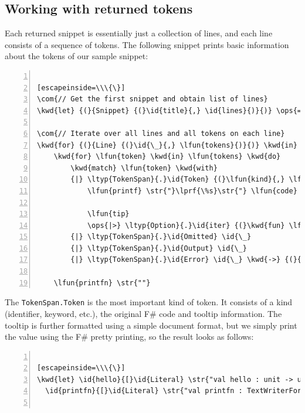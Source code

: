 \documentclass{article}
\newcommand{\id}[1]{\textcolor{black}{#1}}
\newcommand{\com}[1]{\textcolor{officegreen}{#1}}
\newcommand{\kwd}[1]{\textcolor{navy}{#1}}
\newcommand{\ops}[1]{\textcolor{purple}{#1}}
\newcommand{\str}[1]{\textcolor{olive}{#1}}
\begin{document}
\subsection*{Working with returned tokens}



Each returned snippet is essentially just a collection of lines, and each line
consists of a sequence of tokens. The following snippet prints basic information
about the tokens of our sample snippet:
\begin{lstlisting}[numbers=left]

[escapeinside=\\\{\}]
\com{// Get the first snippet and obtain list of lines}
\kwd{let} {(}{Snippet} {(}\id{title}{,} \id{lines}{)}{)} \ops{=} \id{snippets} \ops{|>} \ltyp{Seq}{.}\id{head}

\com{// Iterate over all lines and all tokens on each line}
\kwd{for} {(}{Line} {(}\id{\_}{,} \lfun{tokens}{)}{)} \kwd{in} \id{lines} \kwd{do}
    \kwd{for} \lfun{token} \kwd{in} \lfun{tokens} \kwd{do}
        \kwd{match} \lfun{token} \kwd{with}
        {|} \ltyp{TokenSpan}{.}\id{Token} {(}\lfun{kind}{,} \lfun{code}{,} \lfun{tip}{)} \kwd{->}
            \lfun{printf} \str{"}\lprf{\%s}\str{"} \lfun{code}

            \lfun{tip}
            \ops{|>} \ltyp{Option}{.}\id{iter} {(}\kwd{fun} \lfun{spans} \kwd{->} \lfun{printfn} \str{"}\lprf{\%A}\str{"} \lfun{spans}{)}
        {|} \ltyp{TokenSpan}{.}\id{Omitted} \id{\_}
        {|} \ltyp{TokenSpan}{.}\id{Output} \id{\_}
        {|} \ltyp{TokenSpan}{.}\id{Error} \id{\_} \kwd{->} {(}{)}

    \lfun{printfn} \str{""}

\end{lstlisting}



The \texttt{TokenSpan.Token} is the most important kind of token. It consists of a kind
(identifier, keyword, etc.), the original F\# code and tooltip information.
The tooltip is further formatted using a simple document format, but we simply
print the value using the F\# pretty printing, so the result looks as follows:
\begin{lstlisting}[numbers=left]

[escapeinside=\\\{\}]
\kwd{let} \id{hello}{[}\id{Literal} \str{"val hello : unit -> unit"}{;} \ops{..}{.}{]} {(}{)} \ops{=}
  \id{printfn}{[}\id{Literal} \str{"val printfn : TextWriterFormat<'T> -> 'T"}{;} \ops{..}{.}{]} \str{"Hello world"}


\end{lstlisting}
\end{document}
